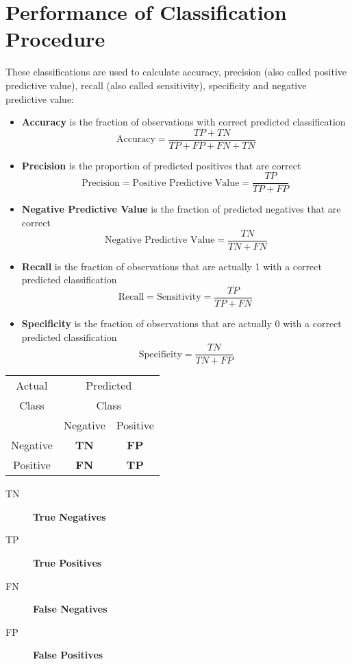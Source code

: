\documentclass[a4paper,12pt]{article}
\begin{document}
	
	
	\section{Performance of Classification Procedure}
	
	These classifications are used to calculate accuracy, precision (also called positive predictive value), recall (also called sensitivity), specificity and negative predictive value:
	
	\begin{itemize}
		\item  \textbf{Accuracy} is the fraction of observations with correct predicted classification
		\[ \mbox{Accuracy}=\frac{TP+TN}{TP+FP+FN+TN}\]
		
		
		\item \textbf{Precision} is the proportion of predicted positives that are correct
		\[
		\mbox{Precision} = \mbox{Positive Predictive Value} =\frac{TP}{TP+FP} \, \]
		
		\item \textbf{Negative Predictive Value} is the  fraction of predicted negatives that are correct
		\[\mbox{Negative Predictive Value} = \frac{TN}{TN+FN}\]
		
		\item \textbf{Recall} is the fraction of observations that are actually 1 with a correct predicted classification
		\[ 
		\mbox{Recall} = \mbox{Sensitivity} = \frac{TP}{TP+FN} \,  \]
		
		\item \textbf{Specificity} is the fraction of observations that are actually 0 with a correct predicted classification
		\[ \mbox{Specificity} = \frac{TN}{TN+FP} \]
		
	\end{itemize}
	{

		\centering
		\begin{table}[!htbp]
			
			\begin{tabular}{|c | *2c |}
				Actual  & \multicolumn{2}{c}{Predicted}\\
				Class  & \multicolumn{2}{c}{Class}\\

				{}   & Negative & Positive       \\
				Negative  &  \textbf{TN} & \textbf{FP}  \\
				Positive   &  \textbf{FN} & \textbf{TP}  \\
				\hline
			\end{tabular}
		\end{table}
	}
	\begin{description}
		\item[TN] \textbf{True Negatives} 
		\item[TP] \textbf{True Positives} 
		\item[FN] \textbf{False Negatives}
		\item[FP] \textbf{False Positives} 
	\end{description}
	
\end{document}
